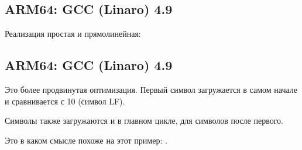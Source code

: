 ﻿\subsection{ARM64: \NonOptimizing GCC (Linaro) 4.9}

Реализация простая и прямолинейная:



\subsection{ARM64: \Optimizing GCC (Linaro) 4.9}

Это более продвинутая оптимизация.
Первый символ загружается в самом начале и сравнивается с 10 (символ \ac{LF}).

Символы также загружаются и в главном цикле, для символов после первого.

Это в каком смысле похоже на этот пример: .




